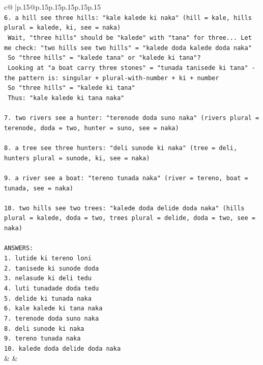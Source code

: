 \documentclass{article}
\begin{document}
{\begin{supertabular}{c@{$\;$}|p{.15\linewidth}@{}p{.15\linewidth}p{.15\linewidth}p{.15\linewidth}p{.15\linewidth}p{.15\linewidth}}
{{{\\ 
\texttt{6. a hill see three hills: "kale kalede ki naka" (hill = kale, hills plural = kalede, ki, see = naka)} \\
\texttt{   Wait, "three hills" should be "kalede" with "tana" for three... Let me check: "two hills see two hills" = "kalede doda kalede doda naka"} \\
\texttt{   So "three hills" = "kalede tana" or "kalede ki tana"?} \\
\texttt{   Looking at "a boat carry three stones" = "tunada tanisede ki tana" {-} the pattern is: singular + plural{-}with{-}number + ki + number} \\
\texttt{   So "three hills" = "kalede ki tana"} \\
\texttt{   Thus: "kale kalede ki tana naka"} \\
\\ 
\texttt{7. two rivers see a hunter: "terenode doda suno naka" (rivers plural = terenode, doda = two, hunter = suno, see = naka)} \\
\\ 
\texttt{8. a tree see three hunters: "deli sunode ki naka" (tree = deli, hunters plural = sunode, ki, see = naka)} \\
\\ 
\texttt{9. a river see a boat: "tereno tunada naka" (river = tereno, boat = tunada, see = naka)} \\
\\ 
\texttt{10. two hills see two trees: "kalede doda delide doda naka" (hills plural = kalede, doda = two, trees plural = delide, doda = two, see = naka)} \\
\\ 
\texttt{ANSWERS:} \\
\texttt{1. lutide ki tereno loni} \\
\texttt{2. tanisede ki sunode doda} \\
\texttt{3. nelasude ki deli tedu} \\
\texttt{4. luti tunadade doda tedu} \\
\texttt{5. delide ki tunada naka} \\
\texttt{6. kale kalede ki tana naka} \\
\texttt{7. terenode doda suno naka} \\
\texttt{8. deli sunode ki naka} \\
\texttt{9. tereno tunada naka} \\
\texttt{10. kalede doda delide doda naka} \\
            }
        }
    }
    & & \\ \\


\end{supertabular}}
\end{document}
